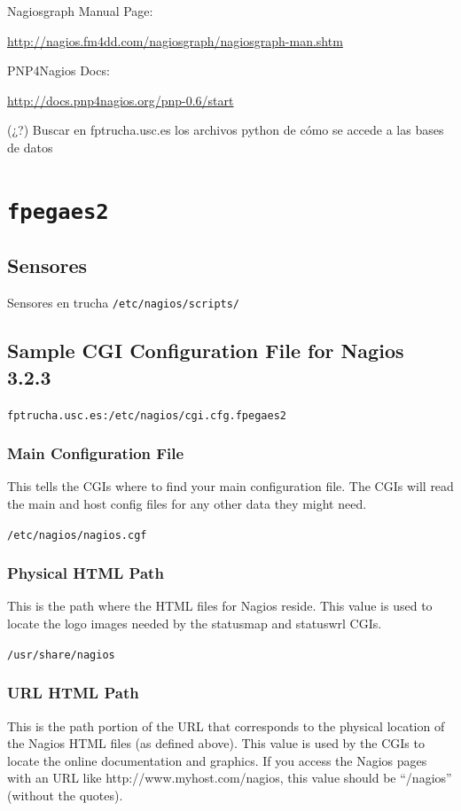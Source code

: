 \documentclass[a4paper]{book}
\begin{document}
Nagiosgraph Manual Page:

\url{http://nagios.fm4dd.com/nagiosgraph/nagiosgraph-man.shtm}

PNP4Nagios Docs:

\url{http://docs.pnp4nagios.org/pnp-0.6/start}

(¿?) Buscar en fptrucha.usc.es los archivos python de cómo se accede a las bases de datos


\section{\texttt{fpegaes2}}

\subsection{Sensores}
Sensores en trucha \texttt{/etc/nagios/scripts/}

\subsection{Sample CGI Configuration File for Nagios 3.2.3}

\texttt{fptrucha.usc.es:/etc/nagios/cgi.cfg.fpegaes2}

\subsubsection{Main Configuration File}
This tells the CGIs where to find your main configuration file. The CGIs will read the main and host config files for any other data they might need.

\texttt{/etc/nagios/nagios.cgf}


\subsubsection{Physical HTML Path}
This is the path where the HTML files for Nagios reside.  This value is used to locate the logo images needed by the statusmap and statuswrl CGIs.

\texttt{/usr/share/nagios}


\subsubsection{URL HTML Path}
This is the path portion of the URL that corresponds to the physical location of the Nagios HTML files (as defined above). This value is used by the CGIs to locate the online documentation and graphics.  If you access the Nagios pages with an URL like
http://www.myhost.com/nagios, 
this value should be ``/nagios'' (without the quotes).
\end{document}
